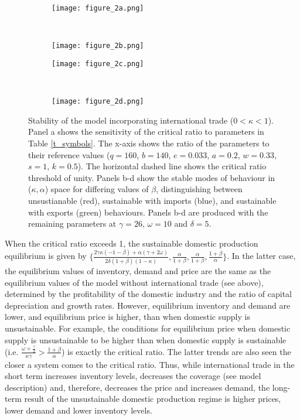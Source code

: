 \documentclass[12pt]{article}
\begin{document}
\begin{figure}[t!]
  \begin{subfigure}{0.5\textwidth}
      \texttt{[image: figure\_2a.png]}
  \end{subfigure}%
  ~%
  \begin{subfigure}{0.5\textwidth}
      \texttt{[image: figure\_2b.png]}
  \end{subfigure}

  \begin{subfigure}{0.5\textwidth}
      \texttt{[image: figure\_2c.png]}
  \end{subfigure}%
  ~%
  \begin{subfigure}{0.5\textwidth}
      \texttt{[image: figure\_2d.png]}
  \end{subfigure}%

  \caption{Stability of the model incorporating international trade ($0 < \kappa < 1$). Panel a shows the sensitivity of the critical ratio to parameters in Table \ref{t_symbols}. The x-axis shows the ratio of the parameters to their reference values ($q = 160$, $b = 140$, $e = 0.033$, $a = 0.2$, $w = 0.33$, $s=1$, $k=0.5$). The horizontal dashed line shows the critical ratio threshold of unity. Panels b-d show the stable modes of behaviour in ($\kappa, \alpha$) space for differing values of $\beta$, distinguishing between unsustianable (red), sustainable with imports (blue), and sustainable with exports (green) behaviours. Panels b-d are produced with the remaining parameters at $\gamma = 26$, $\omega = 10$ and $\delta = 5$.}
  \label{figure2}
\end{figure}

When the critical ratio exceeds 1, the sustainable domestic production equilibrium is given by $\{\frac{2 \gamma \kappa (- 1 - \beta) + \alpha (\gamma + 2 \omega)}{2 \delta (1+\beta)(1 - \kappa) }, \frac{\alpha}{1 + \beta}, \frac{\alpha}{1 + \beta}, \frac{1 + \beta}{\alpha}\}$. In the latter case, the equilibrium values of inventory, demand and price are the same as the equilibrium values of the model without international trade (see above), determined by the profitability of the domestic industry and the ratio of capital depreciation and growth rates. However, equilibrium inventory and demand are lower, and equilibrium price is higher, than when domestic supply is unsustainable. For example, the conditions for equilibrium price when domestic supply is unsustainable to be higher than when domestic supply is sustainable (i.e. $\frac{\omega + \frac{\gamma}{2}}{\kappa \gamma} > \frac{1 + \beta}{\alpha}$) is exactly the critical ratio. The latter trends are also seen the closer a system comes to the critical ratio. Thus, while international trade in the short term increases inventory levels, decreases the coverage (see model description) and, therefore, decreases the price and increases demand, the long-term result of the unsustainable domestic production regime is higher prices, lower demand and lower inventory levels.
\end{document}
